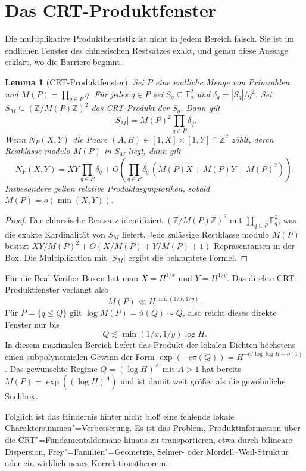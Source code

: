 \documentclass[11pt,a4paper]{article}
\newtheorem{lemma}[theorem]{Lemma}
\begin{document}
\section{Das CRT-Produktfenster}
\label{sec:crt-window}

Die multiplikative Produktheuristik ist nicht in jedem Bereich falsch. Sie ist im endlichen Fenster des chinesischen Restsatzes exakt, und genau diese Aussage erklärt, wo die Barriere beginnt.

\begin{lemma}[CRT-Produktfenster]
\label{lem:crt-window}
Sei $P$ eine endliche Menge von Primzahlen und $M(P)=\prod_{q\in P}q$.
Für jedes $q\in P$ sei $S_q\subseteq\mathbb F_q^2$ und
$\delta_q=|S_q|/q^2$. Sei $S_M\subseteq(\mathbb Z/M(P)\mathbb Z)^2$
das CRT-Produkt der $S_q$. Dann gilt
\[
  |S_M|=M(P)^2\prod_{q\in P}\delta_q.
\]
Wenn $N_P(X,Y)$ die Paare $(A,B)\in[1,X]\times[1,Y]\cap\mathbb Z^2$
zählt, deren Restklasse modulo $M(P)$ in $S_M$ liegt, dann gilt
\[
  N_P(X,Y)
  = XY\prod_{q\in P}\delta_q
    + O\!\left(\prod_{q\in P}\delta_q\,
      (M(P)X+M(P)Y+M(P)^2)\right).
\]
Insbesondere gelten relative Produktasymptotiken, sobald
$M(P)=o(\min(X,Y))$.
\end{lemma}

\begin{proof}
Der chinesische Restsatz identifiziert $(\mathbb Z/M(P)\mathbb Z)^2$
mit $\prod_{q\in P}\mathbb F_q^2$, was die exakte Kardinalität von
$S_M$ liefert. Jede zulässige Restklasse modulo $M(P)$ besitzt
$XY/M(P)^2+O(X/M(P)+Y/M(P)+1)$ Repräsentanten in der Box. Die Multiplikation
mit $|S_M|$ ergibt die behauptete Formel.
\end{proof}

Für die Beal-Verifier-Boxen hat man $X=H^{1/x}$ und $Y=H^{1/y}$.
Das direkte CRT-Produktfenster verlangt also
\[
  M(P)\ll H^{\min(1/x,1/y)}.
\]
Für $P=\{q\le Q\}$ gilt $\log M(P)=\vartheta(Q)\sim Q$, also reicht
dieses direkte Fenster nur bis
\[
  Q\lesssim \min(1/x,1/y)\log H.
\]
In diesem maximalen Bereich liefert das Produkt der lokalen Dichten
höchstens einen subpolynomialen Gewinn der Form
$\exp(-c\pi(Q))=H^{-c/\log\log H+o(1)}$. Das gewünschte Regime
$Q=(\log H)^A$ mit $A>1$ hat bereits
$M(P)=\exp((\log H)^A)$ und ist damit weit größer als die gewöhnliche
Suchbox.

Folglich ist das Hindernis hinter  nicht bloß eine
fehlende lokale Charaktersummen"=Verbesserung. Es ist das Problem,
Produktinformation über die CRT"=Fundamentaldomäne hinaus zu
transportieren, etwa durch bilineare Dispersion, Frey"=Familien"=Geometrie,
Selmer- oder Mordell--Weil-Struktur oder ein wirklich neues
Korrelationstheorem.
\end{document}
